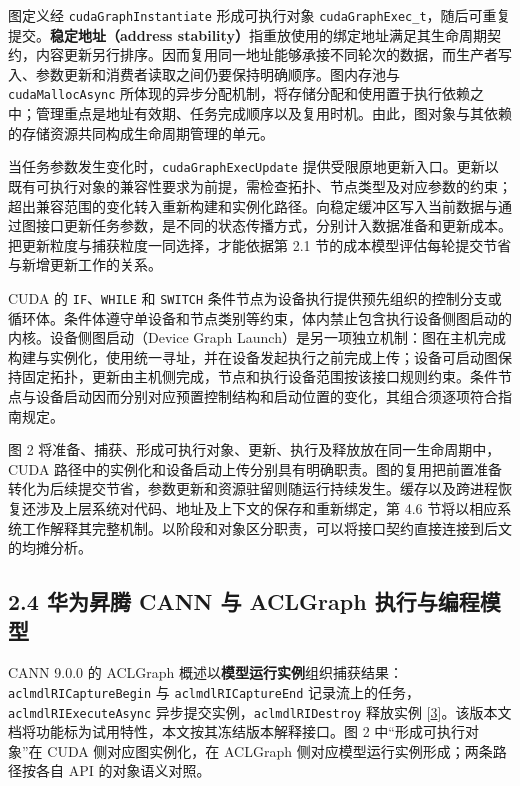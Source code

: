 \documentclass[UTF8,10.5pt,fontset=windows]{ctexart}
\begin{document}
图定义经 \nolinkurl{cudaGraphInstantiate} 形成可执行对象
\nolinkurl{cudaGraphExec_t}，随后可重复提交。\textbf{稳定地址（address
stability）}指重放使用的绑定地址满足其生命周期契约，内容更新另行排序。因而复用同一地址能够承接不同轮次的数据，而生产者写入、参数更新和消费者读取之间仍要保持明确顺序。图内存池与
\nolinkurl{cudaMallocAsync}
所体现的异步分配机制，将存储分配和使用置于执行依赖之中；管理重点是地址有效期、任务完成顺序以及复用时机。由此，图对象与其依赖的存储资源共同构成生命周期管理的单元。

当任务参数发生变化时，\nolinkurl{cudaGraphExecUpdate}
提供受限原地更新入口。更新以既有可执行对象的兼容性要求为前提，需检查拓扑、节点类型及对应参数的约束；超出兼容范围的变化转入重新构建和实例化路径。向稳定缓冲区写入当前数据与通过图接口更新任务参数，是不同的状态传播方式，分别计入数据准备和更新成本。把更新粒度与捕获粒度一同选择，才能依据第
2.1 节的成本模型评估每轮提交节省与新增更新工作的关系。

CUDA 的 \nolinkurl{IF}、\nolinkurl{WHILE} 和 \nolinkurl{SWITCH}
条件节点为设备执行提供预先组织的控制分支或循环体。条件体遵守单设备和节点类别等约束，体内禁止包含执行设备侧图启动的内核。设备侧图启动（Device
Graph
Launch）是另一项独立机制：图在主机完成构建与实例化，使用统一寻址，并在设备发起执行之前完成上传；设备可启动图保持固定拓扑，更新由主机侧完成，节点和执行设备范围按该接口规则约束。条件节点与设备启动因而分别对应预置控制结构和启动位置的变化，其组合须逐项符合指南规定。

图 2
将准备、捕获、形成可执行对象、更新、执行及释放放在同一生命周期中，CUDA
路径中的实例化和设备启动上传分别具有明确职责。图的复用把前置准备转化为后续提交节省，参数更新和资源驻留则随运行持续发生。缓存以及跨进程恢复还涉及上层系统对代码、地址及上下文的保存和重新绑定，第
4.6
节将以相应系统工作解释其完整机制。以阶段和对象区分职责，可以将接口契约直接连接到后文的均摊分析。

\hypertarget{section-2-4}{%
\subsection{2.4 华为昇腾 CANN 与 ACLGraph
执行与编程模型}\label{section-2-4}}

CANN 9.0.0 的 ACLGraph
概述以\textbf{模型运行实例}组织捕获结果：\nolinkurl{aclmdlRICaptureBegin}
与 \nolinkurl{aclmdlRICaptureEnd}
记录流上的任务，\nolinkurl{aclmdlRIExecuteAsync}
异步提交实例，\nolinkurl{aclmdlRIDestroy} 释放实例
{[}\protect\hyperlink{ref-cann900overview}{3}{]}。该版本文档将功能标为试用特性，本文按其冻结版本解释接口。图
2 中``形成可执行对象''在 CUDA 侧对应图实例化，在 ACLGraph
侧对应模型运行实例形成；两条路径按各自 API 的对象语义对照。
\end{document}
